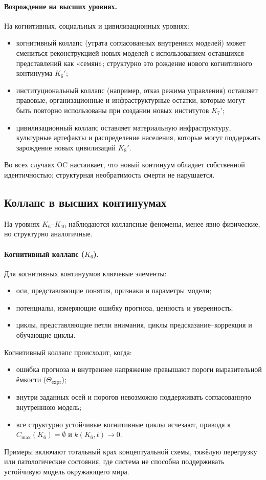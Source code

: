 \paragraph{Возрождение на высших уровнях.}
На когнитивных, социальных и цивилизационных уровнях:
\begin{itemize}
  \item когнитивный коллапс (утрата согласованных внутренних моделей) может
        смениться реконструкцией новых моделей с использованием оставшихся
        представлений как «семян»; структурно это рождение нового когнитивного
        континуума \(K_6'\);
  \item институциональный коллапс (например, отказ режима управления) оставляет
        правовые, организационные и инфраструктурные остатки, которые могут быть
        повторно использованы при создании новых институтов \(K_7'\);
  \item цивилизационный коллапс оставляет материальную инфраструктуру,
        культурные артефакты и распределение населения, которые могут поддержать
        зарождение новых цивилизаций \(K_8'\).
\end{itemize}

Во всех случаях OC настаивает, что новый континуум обладает собственной
идентичностью; структурная необратимость смерти не нарушается.

\subsection{Коллапс в высших континуумах}

На уровнях \(K_6\)–\(K_{10}\) наблюдаются коллапсные феномены, менее явно
физические, но структурно аналогичные.

\paragraph{Когнитивный коллапс (\texorpdfstring{\(K_6\)}{K_6}).}
Для когнитивных континуумов ключевые элементы:
\begin{itemize}
  \item оси, представляющие понятия, признаки и параметры модели;
  \item потенциалы, измеряющие ошибку прогноза, ценность и уверенность;
  \item циклы, представляющие петли внимания, циклы предсказание–коррекция и
        обучающие циклы.
\end{itemize}
Когнитивный коллапс происходит, когда:
\begin{itemize}
  \item ошибка прогноза и внутреннее напряжение превышают пороги
        выразительной ёмкости (\(\Theta_{\mathrm{expr}}\));
  \item внутри заданных осей и порогов невозможно поддерживать согласованную
        внутреннюю модель;
  \item все структурно устойчивые когнитивные циклы исчезают, приводя к
        \(C_{\max}(K_6)=\emptyset\) и \(k(K_6,t)\to 0\).
\end{itemize}
Примеры включают тотальный крах концептуальной схемы, тяжёлую перегрузку или
патологические состояния, где система не способна поддерживать устойчивую модель
окружающего мира.

